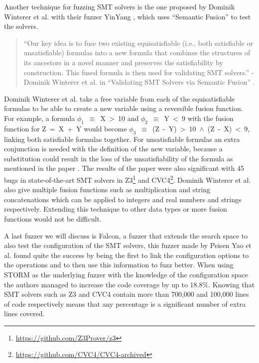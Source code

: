 \label{fuzzing:SemanticFusion}
Another technique for fuzzing SMT solvers is the one proposed by Dominik Winterer et al. with their fuzzer YinYang \cite{43YinYang}, which uses “Semantic Fusion” to test the solvers.
\begin{quote}
	\label{quote:Fuzzing:YinYang}
	“Our key idea is to fuse two existing equisatisfiable (i.e., both satisfiable or unsatisfiable) formulas into a new formula that combines the structures of its ancestors in a novel manner and preserves the satisfiability by construction. This fused formula is then used for validating SMT solvers.”
	\newline
	-Dominik Winterer et al. in “Validating SMT Solvers via Semantic Fusion” \cite{43YinYang}.
\end{quote}
Dominik Winterer et al. take a free variable from each of the equisatisfiable formulas to be able to create a new variable using a reversible fusion function. For example, a formula \mbox{$\phi_1$ $\equiv$ X > 10} and \mbox{$\phi_2$ $\equiv$ Y < 9} with the fusion function for \mbox{Z = X + Y} would become \mbox{$\phi_3$ $\equiv$ (Z - Y) > 10 $\land$ (Z - X) < 9}, linking both satisfiable formulas together. For unsatisfiable formulas an extra conjunction is needed with the definition of the new variable, because a substitution could result in the loss of the unsatisfiability of the formula as mentioned in the paper \cite{43YinYang}. The results of the paper were also significant with 45 bugs in state-of-the-art SMT solvers in Z3\footnote{\url{https://github.com/Z3Prover/z3}} and CVC4\footnote{\url{https://github.com/CVC4/CVC4-archived}}. Dominik Winterer et al. also give multiple fusion functions such as multiplication and string concatenations which can be applied to integers and real numbers and strings respectively. Extending this technique to other data types or more fusion functions would not be difficult.

A last fuzzer we will discuss is Falcon, a fuzzer that extends the search space to also test the configuration of the SMT solvers, this fuzzer made by Peisen Yao et al. \cite{42FalconFuzzingConfigurationSettingsAndNormal} found quite the success by being the first to link the configuration options to the operations and to then use this information to fuzz better.
When using STORM as the underlying fuzzer with the knowledge of the configuration space the authors managed to increase the code coverage by up to 18.8\%. Knowing that SMT solvers such as Z3 and CVC4 contain more than 700,000 and 100,000 lines of code respectively means that any percentage is a significant number of extra lines covered.


